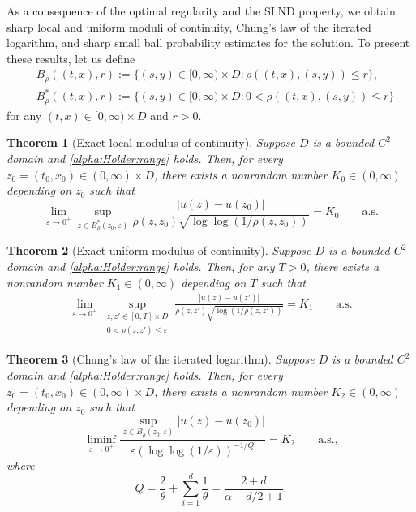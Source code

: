 \documentclass[reqno]{amsart}
\newcommand{\1}{\mathbf 1}
\numberwithin{equation}{section}
\newtheorem{theorem}{Theorem}[section]
\theoremstyle{definition}
\begin{document}

As a consequence of the optimal regularity and the SLND property, we obtain sharp local and uniform moduli of continuity, Chung's law of the iterated logarithm, and sharp small ball probability estimates for the solution.
To present these results, let us define
\begin{align}
	&B_\rho((t,x),r) := \{ (s,y) \in [0,\infty) \times D : \rho((t,x),(s,y)) \le r \},\\
	&B^*_\rho((t,x),r) := \{ (s,y) \in [0,\infty) \times D : 0< \rho((t,x),(s,y)) \le r\}
\end{align}
for any $(t,x) \in [0,\infty) \times D$ and $r>0$.

\begin{theorem}[Exact local modulus of continuity]\label{thm:moc}
Suppose \(D\) is a bounded \(C^2\) domain and
\eqref{alpha:Holder:range} holds. 
Then, for every
\(z_0=(t_0,x_0)\in(0,\infty)\times D\), there exists a nonrandom number 
\(K_0 \in(0,\infty)\) depending on $z_0$ such that
\[
    \lim_{\varepsilon\to0^+}
    \sup_{z\in B_\rho^*(z_0,\varepsilon)}
    \frac{|u(z)-u(z_0)|}
    {\rho(z,z_0)\sqrt{\log\log(1/\rho(z,z_0))}}
    =
    K_0
    \qquad\text{a.s.}
\]
\end{theorem}

\begin{theorem}[Exact uniform modulus of continuity]\label{thm:umoc}
Suppose \(D\) is a bounded \(C^2\) domain and
\eqref{alpha:Holder:range} holds. 
Then, for any $T>0$, there exists a nonrandom number \(K_1 \in(0,\infty)\) depending on $T$ such that
\begin{align}\label{umoc}
    \lim_{\varepsilon\to0^+}
    \sup_{\substack{z,z'\in [0,T]\times D\\0<\rho(z,z')\le\varepsilon}}
    \frac{|u(z)-u(z')|}
    {\rho(z,z')\sqrt{\log(1/\rho(z,z'))}}
    =
    K_1
    \qquad\text{a.s.}
\end{align}
\end{theorem}


\begin{theorem}[Chung's law of the iterated logarithm]\label{thm:lil}
Suppose \(D\) is a bounded \(C^2\) domain and
\eqref{alpha:Holder:range} holds. 
Then, for every \(z_0=(t_0,x_0)\in(0,\infty)\times D\), there exists a nonrandom number \(K_2 \in(0,\infty)\) depending on $z_0$ such that
\[
    \liminf_{\varepsilon\to0^+}
    \frac{
        \sup_{z\in B_\rho(z_0,\varepsilon)}
        |u(z)-u(z_0)|
    }{
        \varepsilon(\log\log(1/\varepsilon))^{-1/Q}
    }
    =
    K_2
    \qquad\text{a.s.,}
\]
where
\begin{equation}\label{eq:Q}
    Q=\frac{2}{\theta}+ \sum_{i=1}^d\frac{1}{\theta}
    =
    \frac{2+d}{\alpha-d/2+1}.
\end{equation}
\end{theorem}
\end{document}
